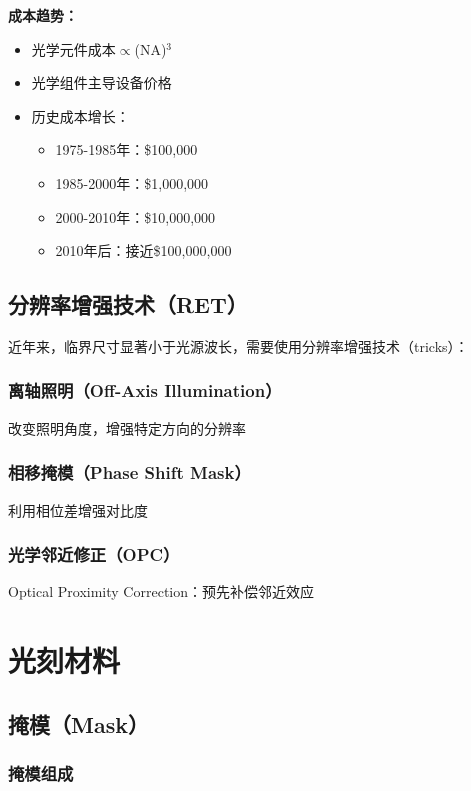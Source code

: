 \documentclass[UTF8,12pt,a4paper]{ctexart}
\begin{document}
\textbf{成本趋势：}
\begin{itemize}
    \item 光学元件成本$\propto$(NA)$^3$
    \item 光学组件主导设备价格
    \item 历史成本增长：
    \begin{itemize}
        \item 1975-1985年：\$100,000
        \item 1985-2000年：\$1,000,000
        \item 2000-2010年：\$10,000,000
        \item 2010年后：接近\$100,000,000
    \end{itemize}
\end{itemize}

\subsection{分辨率增强技术（RET）}

近年来，临界尺寸显著小于光源波长，需要使用分辨率增强技术（tricks）：

\subsubsection{离轴照明（Off-Axis Illumination）}

改变照明角度，增强特定方向的分辨率

\subsubsection{相移掩模（Phase Shift Mask）}

利用相位差增强对比度

\subsubsection{光学邻近修正（OPC）}

Optical Proximity Correction：预先补偿邻近效应

\section{光刻材料}

\subsection{掩模（Mask）}

\subsubsection{掩模组成}
\end{document}
